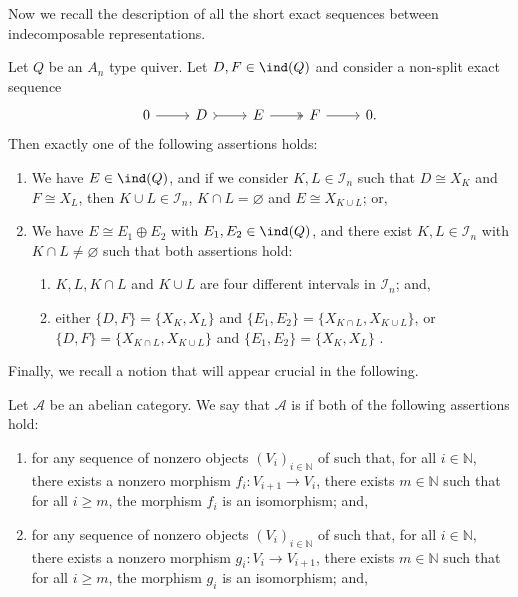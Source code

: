     Now we recall the description of all the short exact sequences between indecomposable representations.

    \begin{theorem} \label{thm:exttypeA} Let $Q$ be an $A_n$ type quiver. Let $D,F \in \ind(Q)$ and consider a non-split exact sequence \[\begin{tikzcd}
	0 & D & E & F &  0.
	\arrow[from=1-1, to=1-2]
	\arrow[tail, from=1-2, to=1-3]
	\arrow[two heads,from=1-3, to=1-4]
	\arrow[from=1-4, to=1-5]
\end{tikzcd} \]
      Then exactly one of the following assertions holds:
      \begin{enumerate}[label=$(\alph*)$,itemsep=1mm]
          \item We have $E \in \ind(Q)$, and if we consider $K,L \in \mathcal{I}_n$ such that $D \cong X_K$ and $F \cong X_L$, then $K \cup L \in \mathcal{I}_n$, $K \cap L = \varnothing$ and $E \cong X_{K \cup L}$; or,
          \item We have $E \cong E_1 \oplus E_2$ with $E_1,E_2 \in \ind(Q)$, and there exist $K,L \in \mathcal{I}_n$ with $K \cap L \neq \varnothing$ such that both assertions hold:
          \begin{enumerate}[label=$\bullet$,itemsep=1mm]
          \item $K,L,K \cap L$ and $K \cup L$ are four different intervals in $\mathcal{I}_n$; and,
          \item either $\{D,F\} = \{X_K, X_L\}$ and $\{E_1,E_2\} = \{X_{K\cap L}, X_{K \cup L} \}$, or \\
          $\{D,F\} = \{X_{K \cap L}, X_{K \cup L}\}$ and $\{E_1,E_2\} = \{X_{K}, X_{L} \}$ .
          \end{enumerate}
      \end{enumerate}
    \end{theorem}

Finally, we recall a notion that will appear crucial in the following. 

    \begin{definition} \label{def:directing}
        Let $\mathscr{A}$ be an abelian category. We say that $\mathscr{A}$ is  if both of the following assertions hold:
        \begin{enumerate}[label=$\bullet$, itemsep=1mm]
            \item for any sequence of nonzero objects $(V_i)_{i \in \mathbb{N}}$ of such that, for all $i \in \mathbb{N}$, there exists a nonzero morphism $f_i : V_{i+1} \longrightarrow V_{i}$, there exists $m \in \mathbb{N}$ such that for all $i \geqslant m$, the morphism $f_i$ is an isomorphism; and,
            \item for any sequence of nonzero objects $(V_i)_{i \in \mathbb{N}}$ of such that, for all $i \in \mathbb{N}$, there exists a nonzero morphism $g_i : V_{i} \longrightarrow V_{i+1}$, there exists $m \in \mathbb{N}$ such that for all $i \geqslant m$, the morphism $g_i$ is an isomorphism; and,
        \end{enumerate}
    \end{definition}


